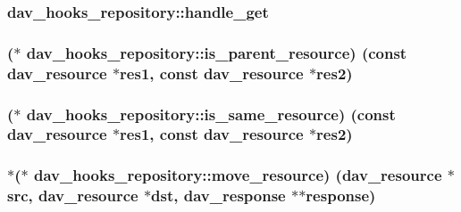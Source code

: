 \subsubsection[{\texorpdfstring{handle\+\_\+get}{handle_get}}]{ dav\+\_\+hooks\+\_\+repository\+::handle\+\_\+get}\hypertarget{structdav__hooks__repository_af1902b90a25b249a0269f414086905d4}{}\label{structdav__hooks__repository_af1902b90a25b249a0269f414086905d4}
\subsubsection[{\texorpdfstring{is\+\_\+parent\+\_\+resource}{is_parent_resource}}]{($\ast$ dav\+\_\+hooks\+\_\+repository\+::is\+\_\+parent\+\_\+resource) (const {\bf dav\+\_\+resource} $\ast$res1, const {\bf dav\+\_\+resource} $\ast$res2)}\hypertarget{structdav__hooks__repository_aa016cf206d17430843b7d847723001a3}{}\label{structdav__hooks__repository_aa016cf206d17430843b7d847723001a3}
\subsubsection[{\texorpdfstring{is\+\_\+same\+\_\+resource}{is_same_resource}}]{($\ast$ dav\+\_\+hooks\+\_\+repository\+::is\+\_\+same\+\_\+resource) (const {\bf dav\+\_\+resource} $\ast$res1, const {\bf dav\+\_\+resource} $\ast$res2)}\hypertarget{structdav__hooks__repository_a51921908d30c5395f6a418c3fc6df08a}{}\label{structdav__hooks__repository_a51921908d30c5395f6a418c3fc6df08a}
\subsubsection[{\texorpdfstring{move\+\_\+resource}{move_resource}}]{$\ast$($\ast$ dav\+\_\+hooks\+\_\+repository\+::move\+\_\+resource) ({\bf dav\+\_\+resource} $\ast${\bf src}, {\bf dav\+\_\+resource} $\ast$dst, {\bf dav\+\_\+response} $\ast$$\ast${\bf response})}\hypertarget{structdav__hooks__repository_a3584ae6f3780b50aaff7ea3224a33e98}{}\label{structdav__hooks__repository_a3584ae6f3780b50aaff7ea3224a33e98}
